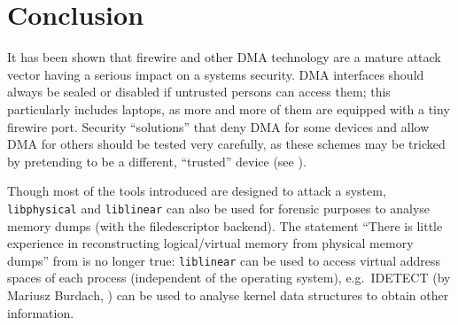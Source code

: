 %
%

\section{Conclusion}

\label{conclusion}

It has been shown that firewire and other DMA technology are a mature attack
vector having a serious impact on a systems security. DMA interfaces should
always be sealed or disabled if untrusted persons can access them; this
particularly includes laptops, as more and more of them are equipped with a tiny
firewire port.  Security ``solutions'' that deny DMA for some devices and allow
DMA for others should be tested very carefully, as these schemes may be tricked
by pretending to be a different, ``trusted'' device (see
\cite{rux2k6firewire:2006}).

Though most of the tools introduced are designed to attack a system,
\texttt{libphysical} and \texttt{liblinear} can also be used for forensic
purposes to analyse memory dumps (with the filedescriptor backend). The
statement ``There is little experience in reconstructing logical/virtual memory
from physical memory dumps'' from \cite{cansecwest_firewire:2005} is no longer
true: \texttt{liblinear} can be used to access virtual address spaces of each
process (independent of the operating system), e.g.~IDETECT (by Mariusz Burdach,
\cite{finding_digital_evidence_in_physical_memory:2006}) can be used to analyse
kernel data structures to obtain other information.

